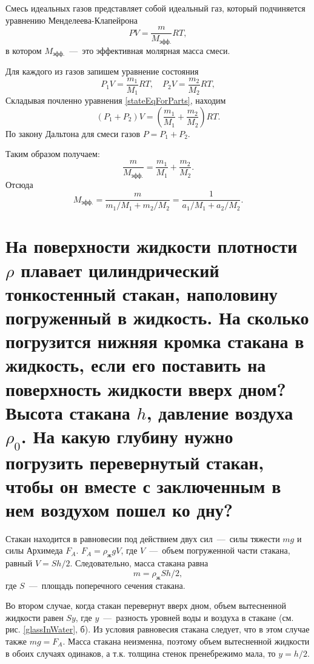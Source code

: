 \solving{}

Смесь идеальных газов представляет собой идеальный газ, который
подчиняется уравнению Менделеева-Клапейрона
\begin{equation}
  PV = \frac{m}{M_\text{эфф.}}RT,
\end{equation}
в котором $M_\text{эфф.}$~---~это эффективная молярная масса
смеси.

Для каждого из газов запишем уравнение состояния
\begin{equation*} \label{stateEqForParts}
  P_1V = \frac{m_1}{M_1}RT, \quad P_2V = \frac{m_2}{M_2}RT,
\end{equation*}
Складывая почленно уравнения \ref{stateEqForParts}, находим
\begin{equation*}
  (P_1+P_2)V = (\frac{m_1}{M_1}+\frac{m_2}{M_2})RT.
\end{equation*}
По закону Дальтона для смеси газов $P = P_1 +P_2$.

Таким образом получаем: 
\begin{equation*}
  \frac{m}{M_\text{эфф.}} = \frac{m_1}{M_1} + \frac{m_2}{M_2}.
\end{equation*}
Отсюда 
\begin{equation}
  M_\text{эфф.} = \frac{m}{m_1/M_1 + m_2/M_2} = \frac{1}{a_1/M_1 + a_2/M_2}.
\end{equation}

\section{На поверхности жидкости плотности $\rho$ плавает
цилиндрический тонкостенный стакан, наполовину погруженный в жидкость.
На сколько погрузится нижняя кромка стакана в жидкость, если его
поставить на поверхность жидкости вверх дном? Высота стакана $h$,
давление воздуха $\rho_0$. На какую глубину нужно
погрузить перевернутый стакан, чтобы он вместе с заключенным в нем воздухом пошел ко дну?}

\solving{}

Стакан находится в равновесии под действием двух сил~---~силы тяжести $mg$ и силы Архимеда $F_A$. $F_A = \rho_\text{ж}gV$, где $V$~---~объем
погруженной части стакана, равный $V = S h/2$. Следовательно, масса
стакана равна
\begin{equation}
  m = \rho_\text{ж} S h /2,
\end{equation}
где $S$~---~площадь поперечного сечения стакана.

Во втором случае, когда стакан перевернут вверх дном, объем вытесненной жидкости равен $S y$, где $y$~---~разность уровней воды и воздуха в стакане (см. рис. \ref{glassInWater}, б). Из условия равновесия стакана
следует, что в этом случае также $mg = F_A$. Масса
стакана неизменна, поэтому объем вытесненной жидкости в обоих случаях одинаков, а т.к. толщина стенок пренебрежимо мала, то $y = h/2$.

